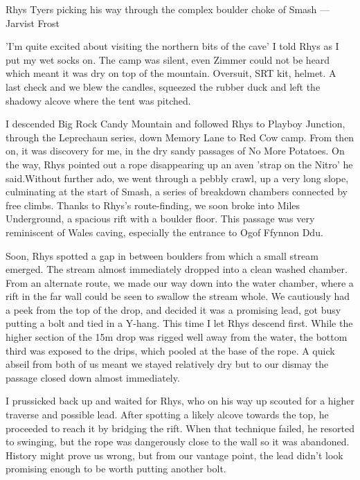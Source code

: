  \begin{marginfigure}
\checkoddpage \ifoddpage \forcerectofloat \else \forceversofloat \fi
\centering
 \caption{Rhys Tyers picking his way through the complex boulder choke of Smash ---Jarvist Frost}
 \label{near sump}
\end{marginfigure}

'I'm quite excited about visiting the northern bits of the cave' I told Rhys as I put my wet socks on. The camp was silent, even Zimmer could not be heard which meant it was dry on top of the mountain. Oversuit, SRT kit, helmet. A last check and we blew the candles, squeezed the rubber duck and left the shadowy alcove where the tent was pitched.

I descended Big Rock Candy Mountain and followed Rhys to Playboy Junction, through the Leprechaun series, down Memory Lane to Red Cow camp. From then on, it was discovery for me, in the dry sandy passages of No More Potatoes. On the way, Rhys pointed out a rope disappearing up an aven 'strap on the Nitro' he said.Without further ado, we went through a pebbly crawl, up a very long slope, culminating at the start of Smash, a series of breakdown chambers connected by free climbs. Thanks to Rhys's route-finding, we soon broke into Miles Underground, a spacious rift with a boulder floor. This passage was very reminiscent of Wales caving, especially the entrance to Ogof Ffynnon Ddu.

Soon, Rhys spotted a gap in between boulders from which a small stream emerged. The stream almost immediately dropped into a clean washed chamber. From an alternate route, we made our way down into the water chamber, where a rift in the far wall could be seen to swallow the stream whole. We cautiously had a peek from the top of the drop, and decided it was a promising lead, got busy putting a bolt and tied in a Y-hang. This time I let Rhys descend first. While the higher section of the 15m drop was rigged well away from the water, the bottom third was exposed to the drips, which pooled at the base of the rope. A quick abseil from both of us meant we stayed relatively dry but to our dismay the passage closed down almost immediately. 

I prussicked back up and waited for Rhys, who on his way up scouted for a higher traverse and possible lead. After spotting a likely alcove towards the top, he proceeded to reach it by bridging the rift. When that technique failed, he resorted to swinging, but the rope was dangerously close to the wall so it was abandoned. History might prove us wrong, but from our vantage point, the lead didn't look promising enough to be worth putting another bolt. 

